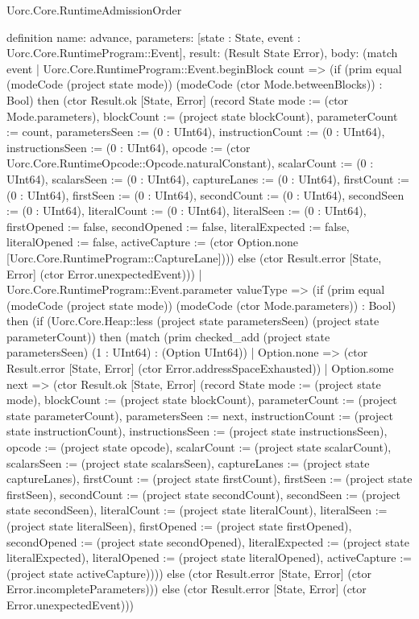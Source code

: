 \begin{lexlean}{Uorc.Core.RuntimeAdmissionOrder}
\begin{semanticmodule}
definition{
  name: advance,
  parameters: [state : State, event : Uorc.Core.RuntimeProgram::Event],
  result: (Result State Error),
  body: (match event
    | Uorc.Core.RuntimeProgram::Event.beginBlock count => (if (prim equal (modeCode (project state mode)) (modeCode (ctor Mode.betweenBlocks)) : Bool) then (ctor Result.ok [State, Error] (record State {mode := (ctor Mode.parameters), blockCount := (project state blockCount), parameterCount := count, parametersSeen := (0 : UInt64), instructionCount := (0 : UInt64), instructionsSeen := (0 : UInt64), opcode := (ctor Uorc.Core.RuntimeOpcode::Opcode.naturalConstant), scalarCount := (0 : UInt64), scalarsSeen := (0 : UInt64), captureLanes := (0 : UInt64), firstCount := (0 : UInt64), firstSeen := (0 : UInt64), secondCount := (0 : UInt64), secondSeen := (0 : UInt64), literalCount := (0 : UInt64), literalSeen := (0 : UInt64), firstOpened := false, secondOpened := false, literalExpected := false, literalOpened := false, activeCapture := (ctor Option.none [Uorc.Core.RuntimeProgram::CaptureLane])})) else (ctor Result.error [State, Error] (ctor Error.unexpectedEvent)))
    | Uorc.Core.RuntimeProgram::Event.parameter valueType => (if (prim equal (modeCode (project state mode)) (modeCode (ctor Mode.parameters)) : Bool) then (if (Uorc.Core.Heap::less (project state parametersSeen) (project state parameterCount)) then (match (prim checked_add (project state parametersSeen) (1 : UInt64) : (Option UInt64))
      | Option.none => (ctor Result.error [State, Error] (ctor Error.addressSpaceExhausted))
      | Option.some next => (ctor Result.ok [State, Error] (record State {mode := (project state mode), blockCount := (project state blockCount), parameterCount := (project state parameterCount), parametersSeen := next, instructionCount := (project state instructionCount), instructionsSeen := (project state instructionsSeen), opcode := (project state opcode), scalarCount := (project state scalarCount), scalarsSeen := (project state scalarsSeen), captureLanes := (project state captureLanes), firstCount := (project state firstCount), firstSeen := (project state firstSeen), secondCount := (project state secondCount), secondSeen := (project state secondSeen), literalCount := (project state literalCount), literalSeen := (project state literalSeen), firstOpened := (project state firstOpened), secondOpened := (project state secondOpened), literalExpected := (project state literalExpected), literalOpened := (project state literalOpened), activeCapture := (project state activeCapture)}))) else (ctor Result.error [State, Error] (ctor Error.incompleteParameters))) else (ctor Result.error [State, Error] (ctor Error.unexpectedEvent)))
}
\end{semanticmodule}
\end{lexlean}
